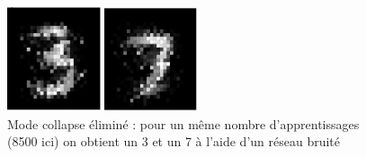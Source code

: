 \begin{figure}[ht]
\begin{center}
\includegraphics[width=0.5\textwidth]{images/gan_bruite.png}\caption{Mode collapse éliminé : pour un même nombre d'apprentissages (8500 ici) on obtient un 3 et un 7 à l'aide d'un réseau bruité}
\end{center}
\end{figure}


